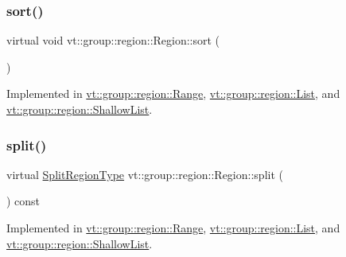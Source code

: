 \mbox{\label{structvt_1_1group_1_1region_1_1_region_a169304bf82a87ff958333595bed2603d}} 
\subsubsection{\texorpdfstring{sort()}{sort()}}
{\footnotesize\ttfamily virtual void vt\+::group\+::region\+::\+Region\+::sort (\begin{DoxyParamCaption}{ }\end{DoxyParamCaption})\hspace{0.3cm}{\ttfamily [pure virtual]}}



Implemented in \hyperlink{structvt_1_1group_1_1region_1_1_range_aa24e09be54662ffd11413803689ed7f8}{vt\+::group\+::region\+::\+Range}, \hyperlink{structvt_1_1group_1_1region_1_1_list_acebca171776662bdf481ed1eb7ee4c09}{vt\+::group\+::region\+::\+List}, and \hyperlink{structvt_1_1group_1_1region_1_1_shallow_list_a1c2ba4da8b89771a0361ff34763d7f62}{vt\+::group\+::region\+::\+Shallow\+List}.

\mbox{\label{structvt_1_1group_1_1region_1_1_region_a2cbbbff6358f0f63235d95501858f512}} 
\subsubsection{\texorpdfstring{split()}{split()}}
{\footnotesize\ttfamily virtual \hyperlink{structvt_1_1group_1_1region_1_1_region_ab8d05c0978c7f38292a9ed5a15498a4b}{Split\+Region\+Type} vt\+::group\+::region\+::\+Region\+::split (\begin{DoxyParamCaption}{ }\end{DoxyParamCaption}) const\hspace{0.3cm}{\ttfamily [pure virtual]}}



Implemented in \hyperlink{structvt_1_1group_1_1region_1_1_range_a0d2542edc1fccecc5ba898484f0ccd3f}{vt\+::group\+::region\+::\+Range}, \hyperlink{structvt_1_1group_1_1region_1_1_list_a0f8352e79bb541ad17ea80843a363304}{vt\+::group\+::region\+::\+List}, and \hyperlink{structvt_1_1group_1_1region_1_1_shallow_list_a766a07e9f1c8580a1b986a71bb80ea66}{vt\+::group\+::region\+::\+Shallow\+List}.

